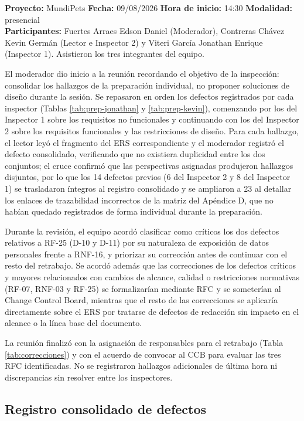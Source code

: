\documentclass[journal,onecolumn]{IEEEtran}
\begin{document}
	\noindent\textbf{Proyecto:} MundiPets \quad \textbf{Fecha:} 09/08/2026 \quad
	\textbf{Hora de inicio:} 14:30 \quad \textbf{Modalidad:} presencial\\
	\textbf{Participantes:} Fuertes Arraes Edson Daniel (Moderador), Contreras Chávez Kevin Germán
	(Lector e Inspector 2) y Viteri García Jonathan Enrique (Inspector 1). Asistieron los tres
	integrantes del equipo.
	
	El moderador dio inicio a la reunión recordando el objetivo de la inspección: consolidar los
	hallazgos de la preparación individual, no proponer soluciones de diseño durante la sesión. Se
	repasaron en orden los defectos registrados por cada inspector (Tablas \ref{tab:prep-jonathan} y
	\ref{tab:prep-kevin}), comenzando por los del Inspector 1 sobre los requisitos no funcionales y
	continuando con los del Inspector 2 sobre los requisitos funcionales y las restricciones de
	diseño. Para cada hallazgo, el lector leyó el fragmento del ERS correspondiente y el moderador
	registró el defecto consolidado, verificando que no existiera duplicidad entre los dos conjuntos;
	el cruce confirmó que las perspectivas asignadas produjeron hallazgos disjuntos, por lo que los 14
	defectos previos (6 del Inspector 2 y 8 del Inspector 1) se trasladaron íntegros al registro
	consolidado y se ampliaron a 23 al detallar los enlaces de trazabilidad incorrectos de la matriz
	del Apéndice D, que no habían quedado registrados de forma individual durante la preparación.
	
	Durante la revisión, el equipo acordó clasificar como críticos los dos defectos relativos a RF-25
	(D-10 y D-11) por su naturaleza de exposición de datos personales frente a RNF-16, y priorizar su
	corrección antes de continuar con el resto del retrabajo. Se acordó además que las correcciones de
	los defectos críticos y mayores relacionados con cambios de alcance, calidad o restricciones
	normativas (RF-07, RNF-03 y RF-25) se formalizarían mediante RFC y se someterían al Change Control
	Board, mientras que el resto de las correcciones se aplicaría directamente sobre el ERS por
	tratarse de defectos de redacción sin impacto en el alcance o la línea base del documento.
	
	La reunión finalizó con la asignación de responsables para el retrabajo (Tabla
	\ref{tab:correcciones}) y con el acuerdo de convocar al CCB para evaluar las tres RFC identificadas.
	No se registraron hallazgos adicionales de última hora ni discrepancias sin resolver entre los
	inspectores.
	
	\subsection{Registro consolidado de defectos}
	
\end{document}
